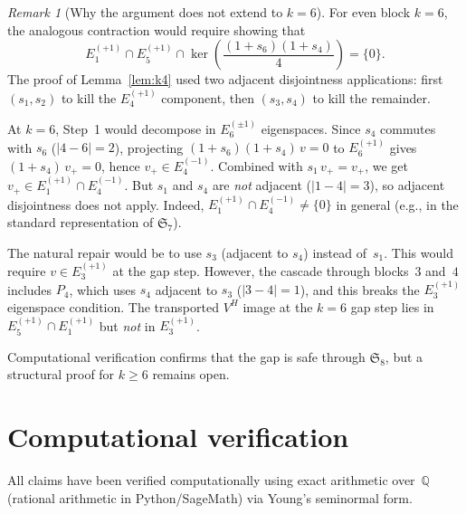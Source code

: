 \documentclass[11pt]{article}
\theoremstyle{definition}
\theoremstyle{remark}
\newtheorem{remark}[theorem]{Remark}
\newcommand{\Sym}{\mathfrak{S}}
\begin{document}
\begin{remark}[Why the argument does not extend to $k = 6$]
\label{rem:k6-obstruction}
For even block $k = 6$, the analogous contraction would require
showing that
\[
  E_1^{(+1)} \cap E_5^{(+1)} \cap
  \ker\!\left(\frac{(1 + s_6)(1 + s_4)}{4}\right) = \{0\}.
\]
The proof of Lemma~\ref{lem:k4} used two adjacent disjointness
applications: first $(s_1, s_2)$ to kill the $E_4^{(+1)}$ component,
then $(s_3, s_4)$ to kill the remainder.

At $k = 6$, Step~1 would decompose in $E_6^{(\pm 1)}$ eigenspaces.
Since $s_4$ commutes with $s_6$ ($|4 - 6| = 2$), projecting
$(1 + s_6)(1 + s_4)\, v = 0$ to $E_6^{(+1)}$ gives
$(1 + s_4)\, v_+ = 0$, hence $v_+ \in E_4^{(-1)}$.  Combined with
$s_1\, v_+ = v_+$, we get $v_+ \in E_1^{(+1)} \cap E_4^{(-1)}$.
But $s_1$ and $s_4$ are \emph{not} adjacent ($|1 - 4| = 3$), so
adjacent disjointness does not apply.  Indeed,
$E_1^{(+1)} \cap E_4^{(-1)} \ne \{0\}$ in general (e.g., in the
standard representation of $\Sym_7$).

The natural repair would be to use $s_3$ (adjacent to $s_4$) instead
of~$s_1$.  This would require $v \in E_3^{(+1)}$ at the gap step.
However, the cascade through blocks~$3$ and~$4$ includes $P_4$,
which uses $s_4$ adjacent to $s_3$ ($|3 - 4| = 1$), and this breaks
the $E_3^{(+1)}$ eigenspace condition.  The transported $V^H$ image
at the $k = 6$ gap step lies in $E_5^{(+1)} \cap E_1^{(+1)}$ but
\emph{not} in $E_3^{(+1)}$.

Computational verification confirms that the gap is safe through
$\Sym_8$, but a structural proof for $k \ge 6$ remains open.
\end{remark}


\section{Computational verification}

All claims have been verified computationally using exact arithmetic
over~$\mathbb{Q}$ (rational arithmetic in Python/SageMath) via
Young's seminormal form.
\end{document}
